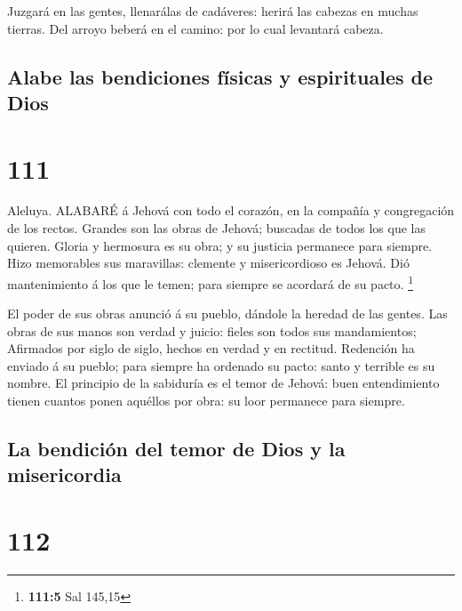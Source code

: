  Juzgará en las gentes, llenarálas de cadáveres: herirá las
cabezas en muchas tierras.  Del arroyo beberá en el camino:
por lo cual levantará cabeza.

\hypertarget{alabe-las-bendiciones-fuxedsicas-y-espirituales-de-dios}{%
\subsection{Alabe las bendiciones físicas y espirituales de
Dios}\label{alabe-las-bendiciones-fuxedsicas-y-espirituales-de-dios}}

\hypertarget{section-110}{%
\section{111}\label{section-110}}

 Aleluya. ALABARÉ á Jehová con todo el corazón, en la
compañía y congregación de los rectos.  Grandes son las
obras de Jehová; buscadas de todos los que las quieren. 
Gloria y hermosura es su obra; y su justicia permanece para siempre.
 Hizo memorables sus maravillas: clemente y misericordioso
es Jehová.  Dió mantenimiento á los que le temen; para
siempre se acordará de su pacto. \footnote{\textbf{111:5} Sal 145,15}

 El poder de sus obras anunció á su pueblo, dándole la
heredad de las gentes.  Las obras de sus manos son verdad y
juicio: fieles son todos sus mandamientos;  Afirmados por
siglo de siglo, hechos en verdad y en rectitud.  Redención
ha enviado á su pueblo; para siempre ha ordenado su pacto: santo y
terrible es su nombre.  El principio de la sabiduría es el
temor de Jehová: buen entendimiento tienen cuantos ponen aquéllos por
obra: su loor permanece para siempre.

\hypertarget{la-bendiciuxf3n-del-temor-de-dios-y-la-misericordia}{%
\subsection{La bendición del temor de Dios y la
misericordia}\label{la-bendiciuxf3n-del-temor-de-dios-y-la-misericordia}}

\hypertarget{section-111}{%
\section{112}\label{section-111}}

